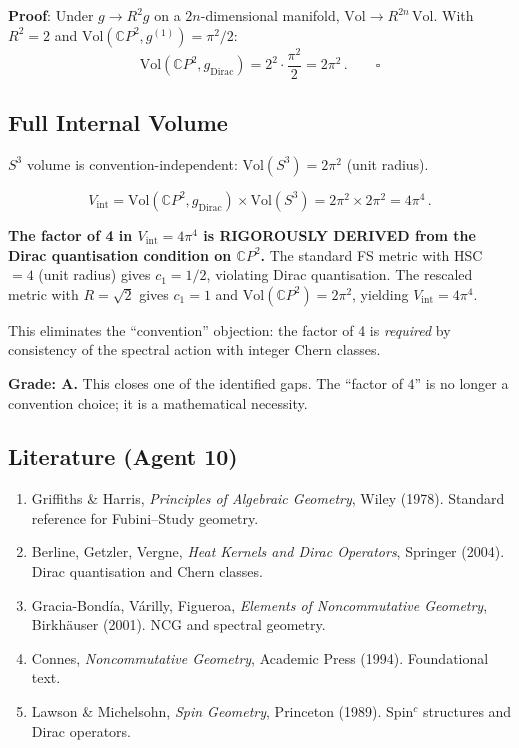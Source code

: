 \documentclass[11pt,a4paper]{article}
\newcommand{\CP}{\mathbb{C}P}
\begin{document}
\textbf{Proof}: Under $g \to R^2 g$ on a $2n$-dimensional manifold, $\mathrm{Vol} \to R^{2n}\,\mathrm{Vol}$. With $R^2 = 2$ and $\mathrm{Vol}(\CP^2, g^{(1)}) = \pi^2/2$:
\begin{equation}
\mathrm{Vol}(\CP^2, g_{\mathrm{Dirac}}) = 2^2 \cdot \frac{\pi^2}{2} = 2\pi^2\,.\qquad\square
\end{equation}

\subsection{Full Internal Volume}

$S^3$ volume is convention-independent: $\mathrm{Vol}(S^3) = 2\pi^2$ (unit radius).

\begin{equation}
V_{\mathrm{int}} = \mathrm{Vol}(\CP^2, g_{\mathrm{Dirac}}) \times \mathrm{Vol}(S^3) = 2\pi^2 \times 2\pi^2 = 4\pi^4\,.
\end{equation}

\begin{tcolorbox}[colback=green!5!white, colframe=green!60!black, title={Agent 10 Result}]
\textbf{The factor of 4 in $V_{\mathrm{int}} = 4\pi^4$ is RIGOROUSLY DERIVED from the Dirac quantisation condition on $\CP^2$.} The standard FS metric with HSC $= 4$ (unit radius) gives $c_1 = 1/2$, violating Dirac quantisation. The rescaled metric with $R = \sqrt{2}$ gives $c_1 = 1$ and $\mathrm{Vol}(\CP^2) = 2\pi^2$, yielding $V_{\mathrm{int}} = 4\pi^4$.

This eliminates the ``convention'' objection: the factor of 4 is \emph{required} by consistency of the spectral action with integer Chern classes.
\end{tcolorbox}

\textbf{Grade: A.} This closes one of the identified gaps. The ``factor of 4'' is no longer a convention choice; it is a mathematical necessity.

\subsection{Literature (Agent 10)}

\begin{enumerate}
\item Griffiths \& Harris, \textit{Principles of Algebraic Geometry}, Wiley (1978). Standard reference for Fubini--Study geometry.
\item Berline, Getzler, Vergne, \textit{Heat Kernels and Dirac Operators}, Springer (2004). Dirac quantisation and Chern classes.
\item Gracia-Bond\'ia, V\'arilly, Figueroa, \textit{Elements of Noncommutative Geometry}, Birkh\"auser (2001). NCG and spectral geometry.
\item Connes, \textit{Noncommutative Geometry}, Academic Press (1994). Foundational text.
\item Lawson \& Michelsohn, \textit{Spin Geometry}, Princeton (1989). Spin$^c$ structures and Dirac operators.
\end{enumerate}
\end{document}
